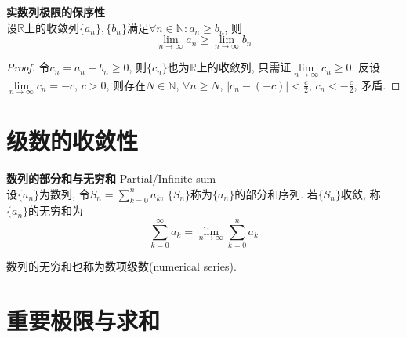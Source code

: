\begin{pro} \textbf{实数列极限的保序性}\\
设$\mathbb{R}$上的收敛列$\{a_n\},\{b_n\}$满足$\forall n\in \mathbb{N}: a_n\ge b_n$, 则
\begin{equation}
    \lim\limits_{n\to \infty} a_n \ge \lim\limits_{n\to \infty} b_n
\end{equation}
\end{pro}
\begin{proof}
令$c_n = a_n-b_n \ge 0$, 则$\{c_n\}$也为$\mathbb{R}$上的收敛列, 只需证$\lim\limits_{n\to \infty} c_n \ge 0$. 反设$\lim\limits_{n\to \infty} c_n=-c$, $c>0$, 则存在$N\in \mathbb{N}$, $\forall n\ge N$, $|c_n - (-c)| < \frac{c}{2}$, $c_n<-\frac{c}{2}$, 矛盾. 
\end{proof}

\section{级数的收敛性}

\begin{dfn}\textbf{数列的部分和与无穷和} Partial/Infinite sum\\
设$\{a_n\}$为数列, 令$S_n=\sum_{k=0}^n a_k$, $\{S_n\}$称为$\{a_n\}$的部分和序列. 
若$\{S_n\}$收敛, 称$\{a_n\}$的无穷和为
\begin{equation}
    \sum_{k=0}^{\infty} a_k= \lim\limits_{n\to \infty} \sum_{k=0}^n a_k
\end{equation}
\end{dfn}
数列的无穷和也称为数项级数(numerical series). 

\section{重要极限与求和}

